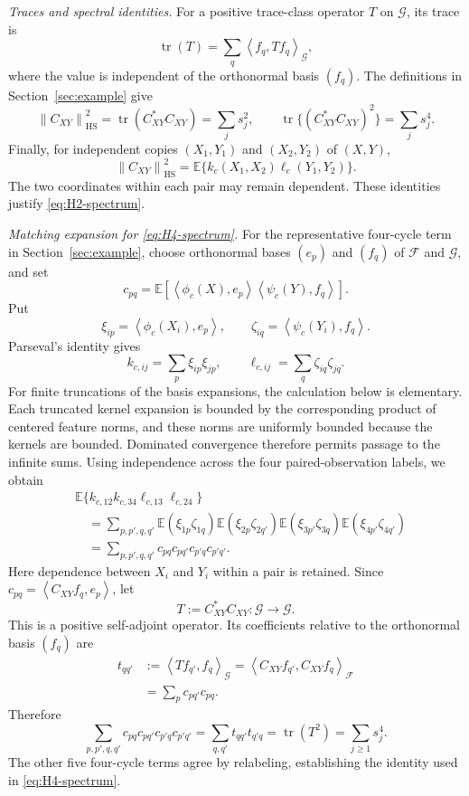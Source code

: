 \documentclass[11pt]{article}
\theoremstyle{plain}
\theoremstyle{definition}
\theoremstyle{remark}
\newcommand{\E}{\mathbb E}
\newcommand{\tr}{\operatorname{tr}}
\newcommand{\inner}[2]{\left\langle #1,#2\right\rangle}
\newcommand{\norm}[1]{\left\lVert #1\right\rVert}
\begin{document}
\medskip
\noindent\emph{Traces and spectral identities.}
For a positive trace-class operator $T$ on $\mathcal G$, its trace is
\[
 \tr(T)=\sum_q\inner{f_q}{Tf_q}_{\mathcal G},
\]
where the value is independent of the orthonormal basis $(f_q)$.
The definitions in Section~\ref{sec:example} give
\[
 \norm{C_{XY}}_{\mathrm{HS}}^2
 =\tr(C_{XY}^{\ast}C_{XY})
 =\sum_j s_j^2,
 \qquad
 \tr\{(C_{XY}^{\ast}C_{XY})^2\}=\sum_j s_j^4.
\]
Finally, for independent copies $(X_1,Y_1)$ and $(X_2,Y_2)$ of $(X,Y)$,
\[
 \norm{C_{XY}}_{\mathrm{HS}}^2
 =\E\{k_c(X_1,X_2)\ell_c(Y_1,Y_2)\}.
\]
The two coordinates within each pair may remain dependent.  These identities
justify \eqref{eq:H2-spectrum}.

\medskip
\noindent\emph{Matching expansion for \eqref{eq:H4-spectrum}.}
For the representative four-cycle term in Section~\ref{sec:example}, choose
orthonormal bases $(e_p)$ and $(f_q)$ of $\mathcal F$ and $\mathcal G$, and
set
\[
 c_{pq}
 =\E\!\left[
   \inner{\phi_c(X)}{e_p}
 \inner{\psi_c(Y)}{f_q}
 \right].
\]
Put
\[
 \xi_{ip}=\inner{\phi_c(X_i)}{e_p},
 \qquad
 \zeta_{iq}=\inner{\psi_c(Y_i)}{f_q}.
\]
Parseval's identity gives
\[
 k_{c,ij}=\sum_p\xi_{ip}\xi_{jp},
 \qquad
 \ell_{c,ij}=\sum_q\zeta_{iq}\zeta_{jq}.
\]
For finite truncations of the basis expansions, the calculation below is
elementary.  Each truncated kernel expansion is bounded by the corresponding
product of centered feature norms, and these norms are uniformly bounded
because the kernels are bounded.  Dominated convergence therefore permits
passage to the infinite sums.  Using independence across the four
paired-observation labels, we obtain
\begin{align*}
 &\E\{k_{c,12}k_{c,34}\ell_{c,13}\ell_{c,24}\}\\
 &\quad=
 \sum_{p,p',q,q'}
 \E(\xi_{1p}\zeta_{1q})
 \E(\xi_{2p}\zeta_{2q'})
 \E(\xi_{3p'}\zeta_{3q})
 \E(\xi_{4p'}\zeta_{4q'})\\
 &\quad=
 \sum_{p,p',q,q'}
 c_{pq}c_{pq'}c_{p'q}c_{p'q'}.
\end{align*}
Here dependence between $X_i$ and $Y_i$ within a pair is retained.  Since
$c_{pq}=\inner{C_{XY}f_q}{e_p}$, let
\[
 T:=C_{XY}^{\ast}C_{XY}:\mathcal G\to\mathcal G.
\]
This is a positive self-adjoint operator.  Its coefficients relative to the
orthonormal basis $(f_q)$ are
\[
\begin{aligned}
 t_{qq'}
 &:=\inner{Tf_{q'}}{f_q}_{\mathcal G}
 =\inner{C_{XY}f_{q'}}{C_{XY}f_q}_{\mathcal F}\\
 &=\sum_p c_{pq'}c_{pq}.
\end{aligned}
\]
Therefore
\[
 \sum_{p,p',q,q'}c_{pq}c_{pq'}c_{p'q}c_{p'q'}
 =\sum_{q,q'}t_{qq'}t_{q'q}
 =\tr(T^2)
 =\sum_{j\ge1}s_j^4.
\]
The other five four-cycle terms agree by relabeling, establishing the
identity used in \eqref{eq:H4-spectrum}.
\end{document}
